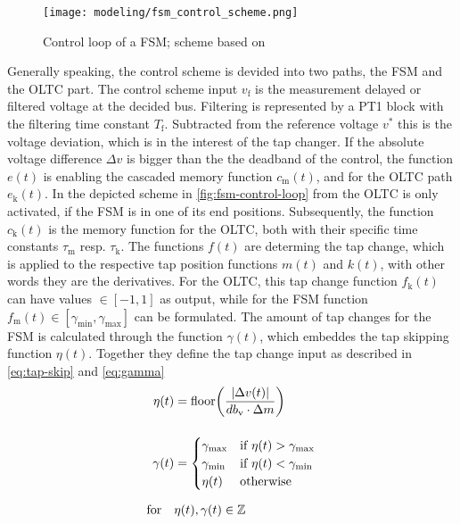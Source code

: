 \begin{figure}[htb!]
    \centering
    \texttt{[image: modeling/fsm\_control\_scheme.png]}
    \caption[Control loop of a \acf{FSM}]{Control loop of a \acs{FSM}; scheme based on \textcite{burlakin_2024}}
    \label{fig:fsm-control-loop}
\end{figure}

Generally speaking, the control scheme is devided into two paths, the \acs{FSM} and the \acs{OLTC} part.
The control scheme input $v_\mathrm{f}$ is the measurement delayed or filtered voltage at the decided bus.
Filtering is represented by a PT1 block with the filtering time constant $T_\mathrm{f}$.
Subtracted from the reference voltage $v^*$ this is the voltage deviation, which is in the interest of the tap changer. 
If the absolute voltage difference $\Delta v$ is bigger than the the deadband of the control, the function $e(t)$ is enabling the cascaded memory function $c_\mathrm{m}(t)$, and for the \acs{OLTC} path $e_\mathrm{k}(t)$.
In the depicted scheme in \autoref{fig:fsm-control-loop} from \autocite{burlakin_2024} the \acs{OLTC} is only activated, if the \acs{FSM} is in one of its end positions.
Subsequently, the function $c_\mathrm{k}(t)$ is the memory function for the \acs{OLTC}, both with their specific time constants $\tau_\mathrm{m}$ resp. $\tau_\mathrm{k}$.
The functions $f(t)$ are determing the tap change, which is applied to the respective tap position functions $m(t)$ and $k(t)$, with other words they are the derivatives.
For the \acs{OLTC}, this tap change function $f_\mathrm{k}(t)$ can have values $\in [-1,1]$ as output, while for the \acs{FSM} function $f_\mathrm{m}(t) \in [\gamma_\mathrm{min},\gamma_\mathrm{max}]$ can be formulated.
The amount of tap changes for the \acs{FSM} is calculated through the function $\gamma(t)$, which embeddes the tap skipping function $\eta(t)$.
Together they define the tap change input as described in \autoref{eq:tap-skip} and \autoref{eq:gamma}
\begin{align}
    \eta(t) &= \text{floor}\bigg( \frac{\vert \Delta v(t) \vert}{db_\mathrm{v} \cdot \Delta m} \bigg) \label{eq:tap-skip}\\[12pt]
    \gamma(t) &= \begin{cases}
        \gamma_\mathrm{max} & \text{if } \eta(t) > \gamma_\mathrm{max} \\
        \gamma_\mathrm{min} & \text{if } \eta(t) < \gamma_\mathrm{min} \\
        \eta(t) & \text{otherwise}
    \end{cases} \label{eq:gamma} \\[6pt]
    \text{for}\quad&\eta(t),\gamma(t) \in \mathbb{Z} \notag
\end{align}
